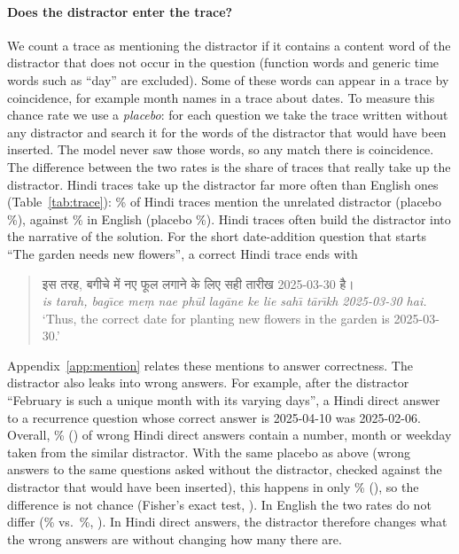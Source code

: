 \paragraph{Does the distractor enter the trace?}
We count a trace as mentioning the distractor if it contains a content word of the distractor that does not occur in the question (function words and generic time words such as ``day'' are excluded). Some of these words can appear in a trace by coincidence, for example month names in a trace about dates. To measure this chance rate we use a \emph{placebo}: for each question we take the trace written without any distractor and search it for the words of the distractor that would have been inserted. The model never saw those words, so any match there is coincidence. The difference between the two rates is the share of traces that really take up the distractor. Hindi traces take up the distractor far more often than English ones (Table~\ref{tab:trace}): \HiMentionDis{}\% of Hindi traces mention the unrelated distractor (placebo \HiMentionDisPlacebo{}\%), against \EnMentionDis{}\% in English (placebo \EnMentionDisPlacebo{}\%). Hindi traces often build the distractor into the narrative of the solution. For the short date-addition question that starts ``The garden needs new flowers'', a correct Hindi trace ends with
\begin{quote}
\foreignlanguage{hindi}{इस तरह, बगीचे में नए फूल लगाने के लिए सही तारीख 2025-03-30 है।}\\
\emph{is tarah, bag\={\i}ce me\d{m} nae ph\={u}l lag\={a}ne ke lie sah\={\i} t\={a}r\={\i}kh 2025-03-30 hai.}\\
`Thus, the correct date for planting new flowers in the garden is 2025-03-30.'
\end{quote}
Appendix~\ref{app:mention} relates these mentions to answer correctness. The distractor also leaks into wrong answers. For example, after the distractor ``February is such a unique month with its varying days'', a Hindi direct answer to a recurrence question whose correct answer is \mbox{2025-04-10} was \mbox{2025-02-06}. Overall, \HiReuseDirect{}\% (\HiReuseDirectN{}) of wrong Hindi direct answers contain a number, month or weekday taken from the similar distractor. With the same placebo as above (wrong answers to the same questions asked without the distractor, checked against the distractor that would have been inserted), this happens in only \HiReuseDirectPlacebo{}\% (\HiReuseDirectPlaceboN{}), so the difference is not chance (Fisher's exact test, \HiReuseDirectP{}). In English the two rates do not differ (\EnReuseDirect{}\% vs.\ \EnReuseDirectPlacebo{}\%, \EnReuseDirectP{}). In Hindi direct answers, the distractor therefore changes what the wrong answers are without changing how many there are.

